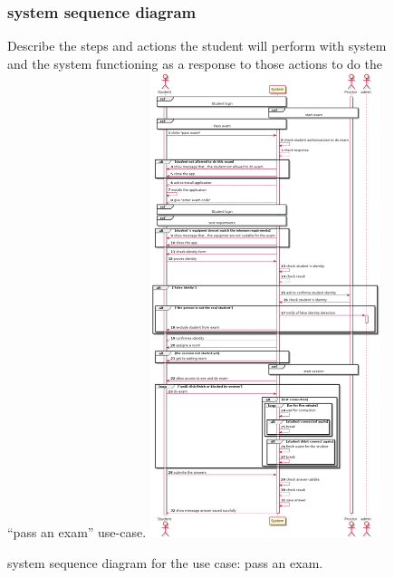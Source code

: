 \documentclass[]{uc2pfecaneva}
\begin{document}
    \begin{figure}[]
        \subsubsection{system sequence diagram}
        Describe the steps and actions the student will perform with system and the system functioning
        as a response to those actions to do the “pass an exam” use-case.
        \centering
        \includegraphics[width=0.6\textwidth]{images/pass_exam}

        \caption{system sequence diagram for the use case: pass an exam.}
    \end{figure}
    \clearpage
\end{document}

